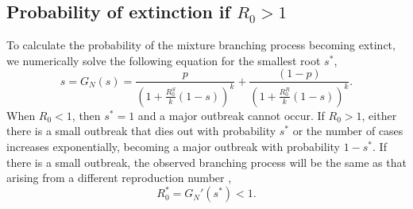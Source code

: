 \documentclass{imammb}
\numberwithin{equation}{section}
\begin{document}





\subsection{Probability of extinction if $R_0>1$}
To calculate the probability of the mixture branching process becoming extinct, we numerically solve the following equation for the smallest root $s^*$, 
\begin{equation}
      s = G_N(s) =  \frac{p}{(1 + \frac{R_0^S}{k}(1-s))^k} +   \frac{(1-p)}{(1 + \frac{R_0^R}{k}(1-s))^k}. 
\end{equation}
When $R_0<1$, then $s^* = 1$ and a major outbreak cannot occur. If $R_0>1$, either there is a small outbreak that dies out with probability $s^*$ or the number of cases increases exponentially, becoming a major outbreak with probability $1-s^*$. If there is a small outbreak, the observed branching process will be the same as that arising from a different reproduction number \citep{Yan2008-jc}, 
\begin{equation}\label{eqn:R0star}
    R_0^* = G_N'(s^*)<1.
\end{equation}
\end{document}
